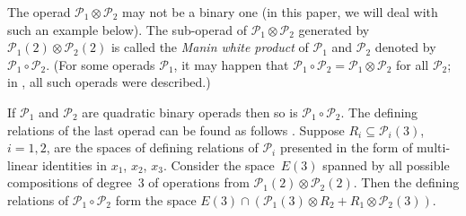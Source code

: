 \documentclass[11pt]{article}
\numberwithin{equation}{section}
\numberwithin{equation}{section}
\begin{document}
The operad $\mathcal P_1\otimes \mathcal P_2$ may not be a binary one (in this paper, we will deal
with such an example below). The sub-operad of $\mathcal P_1\otimes \mathcal P_2$ generated
by $\mathcal P_1(2)\otimes \mathcal P_2(2)$ is
called the {\em Manin white product} of $\mathcal P_1$ and $\mathcal P_2$ denoted by
$\mathcal P_1\circ\mathcal P_2$.
(For some operads $\mathcal P_1$, it may happen that
$\mathcal P_1\circ \mathcal P_2 = \mathcal P_1\otimes \mathcal P_2$
for all $\mathcal P_2$; in \cite{Vallette2008}, all such operads were described.)

If $\mathcal P_1$ and $\mathcal P_2$ are quadratic binary operads then so is
$\mathcal P_1\circ \mathcal P_2$. The defining relations of the last operad can be found
as follows \cite{GK-1994}. Suppose $R_i\subseteq \mathcal P_i(3)$,
$i=1,2$, are the spaces of defining relations of
$\mathcal P_i$ presented in the form of multi-linear identities in $x_1$, $x_2$, $x_3$.
Consider the space~$E(3)$ spanned by all possible compositions of degree~3 of operations from
$\mathcal P_1(2)\otimes \mathcal P_2(2)$.
Then the defining relations of $\mathcal P_1\circ \mathcal P_2$
form the space $E(3)\cap (\mathcal P_1(3)\otimes R_2 + R_1\otimes \mathcal P_2(3))$.
\end{document}
